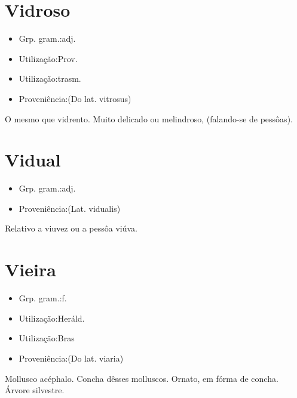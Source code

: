 \documentclass{article}
\begin{document}
\section{Vidroso}
\begin{itemize}
\item {Grp. gram.:adj.}
\end{itemize}
\begin{itemize}
\item {Utilização:Prov.}
\end{itemize}
\begin{itemize}
\item {Utilização:trasm.}
\end{itemize}
\begin{itemize}
\item {Proveniência:(Do lat. \textunderscore vitrosus\textunderscore )}
\end{itemize}
O mesmo que \textunderscore vidrento\textunderscore .
Muito delicado ou melindroso, (falando-se de pessôas).
\section{Vidual}
\begin{itemize}
\item {Grp. gram.:adj.}
\end{itemize}
\begin{itemize}
\item {Proveniência:(Lat. \textunderscore vidualis\textunderscore )}
\end{itemize}
Relativo a viuvez ou a pessôa viúva.
\section{Vieira}
\begin{itemize}
\item {Grp. gram.:f.}
\end{itemize}
\begin{itemize}
\item {Utilização:Heráld.}
\end{itemize}
\begin{itemize}
\item {Utilização:Bras}
\end{itemize}
\begin{itemize}
\item {Proveniência:(Do lat. \textunderscore viaria\textunderscore )}
\end{itemize}
Mollusco acéphalo.
Concha dêsses molluscos.
Ornato, em fórma de concha.
Árvore silvestre.
\end{document}

